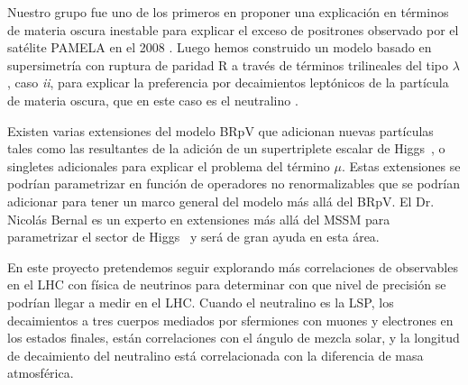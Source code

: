 \begin{gravitinodm}
Nuestro grupo \cite{Nardi:2008ix} fue uno de los
primeros en proponer una explicación en términos de materia oscura
inestable para explicar el exceso de positrones observado por el
satélite PAMELA en el 2008 \cite{Adriani:2008zr}. Luego hemos
construido un modelo basado en supersimetría con ruptura de paridad R
a través de términos trilineales del tipo $\lambda$, caso
{\it ii}, para explicar la preferencia por decaimientos leptónicos
de la partícula de materia oscura, que en este caso es el
neutralino \cite{Sierra:2009zq}.
\end{gravitinodm}

\begin{bbrpvlhc}
  Existen varias extensiones del modelo BRpV que adicionan nuevas
  partículas tales como las resultantes de la adición de un
  supertriplete escalar de Higgs~\cite{}, o singletes adicionales para
  explicar el problema del término $\mu$. Estas extensiones se podrían
  parametrizar en función de operadores no renormalizables que se
  podrían adicionar para tener un marco general del modelo más allá del
  BRpV. El Dr. Nicolás Bernal es un experto en extensiones más allá
  del MSSM para parametrizar el sector de Higgs~\cite{Bernal:2007uv,Bernal:2009hd}
  y será de gran ayuda en esta área.
\end{bbrpvlhc}

\begin{brpvlhc}
  En este proyecto pretendemos seguir explorando más correlaciones
  de observables en el LHC con física de neutrinos para determinar con
  que nivel de precisión se podrían llegar a medir en el LHC. Cuando
  el neutralino es la LSP, los decaimientos a tres cuerpos mediados
  por sfermiones con muones y electrones en los estados finales, están
  correlaciones con el ángulo de mezcla solar, y la longitud de
  decaimiento del neutralino está correlacionada con la diferencia de
  masa atmosférica.
\end{brpvlhc}


